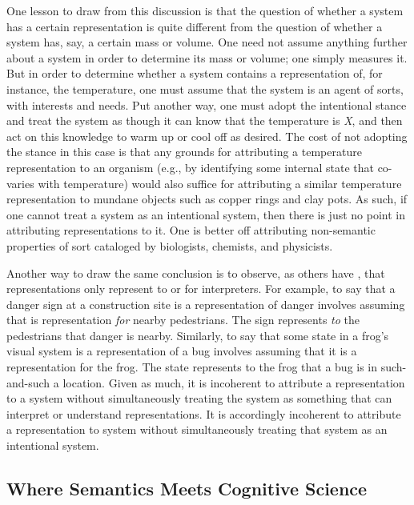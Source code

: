 One lesson to draw from this discussion is that the question of whether a system has a certain representation is quite different from the question of whether a system has, say, a certain mass or volume. One need not assume anything further about a system in order to determine its mass or volume; one simply measures it. But in order to determine whether a system contains a representation of, for instance, the temperature, one must assume that the system is an agent of sorts, with interests and needs. Put another way, one must adopt the intentional stance and treat the system as though it can know that the temperature is \textit{X}, and then act on this knowledge to warm up or cool off as desired. The cost of not adopting the stance in this case is that any grounds for attributing a temperature representation to an organism (e.g., by identifying some internal state that co-varies with temperature) would also suffice for attributing a similar temperature representation to mundane objects such as copper rings and clay pots. As such, if one cannot treat a system as an intentional system, then there is just no point in attributing representations to it. One is better off attributing non-semantic properties of sort cataloged by biologists, chemists, and physicists.  

Another way to draw the same conclusion is to observe, as others have \citep[e.g.,][]{Brandom:1994}, that representations only represent to or for interpreters. For example, to say that a danger sign at a construction site is a representation of danger involves assuming that is representation \textit{for} nearby pedestrians. The sign represents \textit{to} the pedestrians that danger is nearby. Similarly, to say that some state in a frog's visual system is a representation of a bug involves assuming that it is a representation for the frog. The state represents to the frog that a bug is in such-and-such a location. Given as much, it is incoherent to attribute a representation to a system without simultaneously treating the system as something that can interpret or understand representations. It is accordingly incoherent to attribute a representation to system without simultaneously treating that system as an intentional system.

\subsection{Where Semantics Meets Cognitive Science}


